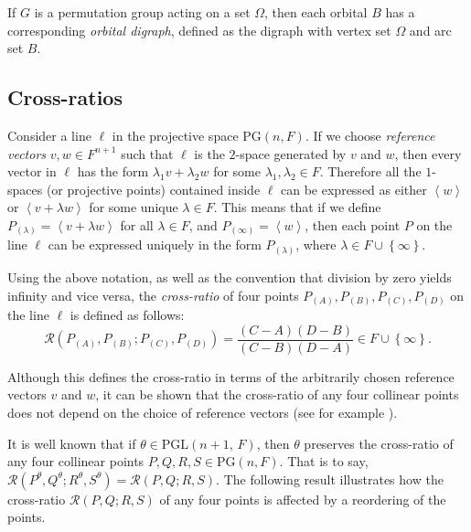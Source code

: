 \documentclass[ALCO, Unicode]{cedram}
\newcommand{\PG}{\mathrm{PG}}
\newcommand{\PGL}{\mathrm{PGL}}
\begin{document}
If $G$ is a permutation group acting on a set $\Omega$, then each orbital $B$ has a corresponding \emph{orbital digraph}, defined as the digraph with vertex set $\Omega$ and arc set $B$.

\subsection{Cross-ratios}

Consider a line $\ell$ in the projective space $\PG(n, F)$. If we choose \emph{reference vectors} $v, w \in F^{n+1}$ such that $\ell$ is the $2$-space generated by $v$ and $w$, then every vector in $\ell$ has the form $\lambda_1 v + \lambda_2 w$ for some $\lambda_1, \lambda_2 \in F$. Therefore all the $1$-spaces (or projective points) contained inside $\ell$ can be expressed as either $\left<w \right>$ or $\left<v + \lambda w \right>$ for some unique $\lambda \in F$. This means that if we define $P_{\left(\lambda \right)} = \left<v + \lambda w \right>$ for all $\lambda \in F$, and $P_{\left(\infty \right)} = \left<w \right>$, then each point $P$ on the line $\ell$ can be expressed uniquely in the form $P_{\left(\lambda \right)}$, where $\lambda \in F \cup \left\{\infty \right\}$.

Using the above notation, as well as the convention that division by zero yields infinity and vice versa, the \emph{cross-ratio} of four points $P_{\left(A \right)}, P_{\left(B \right)}, P_{\left(C \right)}, P_{\left(D \right)}$ on the line $\ell$ is defined as follows:
\begin{displaymath}
\mathcal{R} {\left(P_{\left(A \right)}, P_{\left(B \right)}; P_{\left(C \right)}, P_{\left(D \right)}\right)} = \frac{\left(C-A \right) \left(D-B \right)}{\left(C-B \right) \left(D-A \right)} \in F \cup \left\{\infty \right\}.
\end{displaymath}

Although this defines the cross-ratio in terms of the arbitrarily chosen reference vectors $v$ and $w$, it can be shown that the cross-ratio of any four collinear points does not depend on the choice of reference vectors (see for example \cite[Section 3.5, Theorem 1]{ref:garner-projective}).

It is well known that if $\theta \in \PGL{\left(n+1,\, F \right)}$, then $\theta$ preserves the cross-ratio of any four collinear points $P, Q, R, S \in \PG{\left(n, F \right)}$. That is to say, $\mathcal{R}{\left(P^\theta, Q^\theta; R^\theta, S^\theta \right)} = \mathcal{R}{\left(P, Q; R, S \right)}$. The following result \cite[Lemma 4.4]{ref:bamberg-analytic} illustrates how the cross-ratio $\mathcal{R} {\left(P, Q; R, S \right)}$ of any four points is affected by a reordering of the points.
\end{document}
